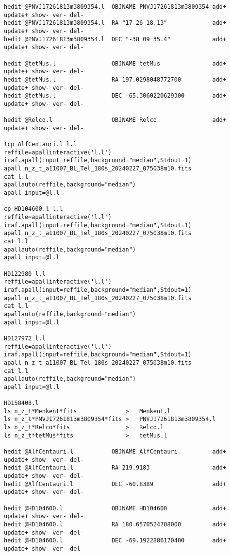 \begin{verbatim}
hedit @PNVJ17261813m3809354.l  OBJNAME PNVJ17261813m3809354 add+ update+ show- ver- del- 
hedit @PNVJ17261813m3809354.l  RA "17 26 18.13"             add+ update+ show- ver- del-
hedit @PNVJ17261813m3809354.l  DEC "-38 09 35.4"            add+ update+ show- ver- del-

hedit @tetMus.l                OBJNAME tetMus               add+ update+ show- ver- del-
hedit @tetMus.l                RA 197.0298048772700         add+ update+ show- ver- del-
hedit @tetMus.l                DEC -65.3060220629300        add+ update+ show- ver- del-

hedit @Relco.l                 OBJNAME Relco                add+ update+ show- ver- del- 

!cp AlfCentauri.l l.l
reffile=apallinteractive('l.l')
iraf.apall(input=reffile,background="median",Stdout=1)
apall n_z_t_a11007_BL_Tel_180s_20240227_075038m10.fits
cat l.l
apallauto(reffile,background="median")
apall input=@l.l

cp HD104600.l l.l
reffile=apallinteractive('l.l')
iraf.apall(input=reffile,background="median",Stdout=1)
apall n_z_t_a11007_BL_Tel_180s_20240227_075038m10.fits
cat l.l
apallauto(reffile,background="median")
apall input=@l.l

HD122980 l.l
reffile=apallinteractive('l.l')
iraf.apall(input=reffile,background="median",Stdout=1)
apall n_z_t_a11007_BL_Tel_180s_20240227_075038m10.fits
cat l.l
apallauto(reffile,background="median")
apall input=@l.l

HD127972 l.l
reffile=apallinteractive('l.l')
iraf.apall(input=reffile,background="median",Stdout=1)
apall n_z_t_a11007_BL_Tel_180s_20240227_075038m10.fits
cat l.l
apallauto(reffile,background="median")
apall input=@l.l

HD158408.l
ls n_z_t*Menkent*fits              >   Menkent.l
ls n_z_t*PNVJ17261813m3809354*fits >   PNVJ17261813m3809354.l
ls n_z_t*Relco*fits                >   Relco.l
ls n_z_t*tetMus*fits               >   tetMus.l                

hedit @AlfCentauri.l           OBJNAME AlfCentauri          add+ update+ show- ver- del-
hedit @AlfCentauri.l           RA 219.9183                  add+ update+ show- ver- del-
hedit @AlfCentauri.l           DEC -60.8389                 add+ update+ show- ver- del-

hedit @HD104600.l              OBJNAME HD104600             add+ update+ show- ver- del-
hedit @HD104600.l              RA 180.6570524708000         add+ update+ show- ver- del-
hedit @HD104600.l              DEC -69.1922886170400        add+ update+ show- ver- del-


\end{verbatim}
